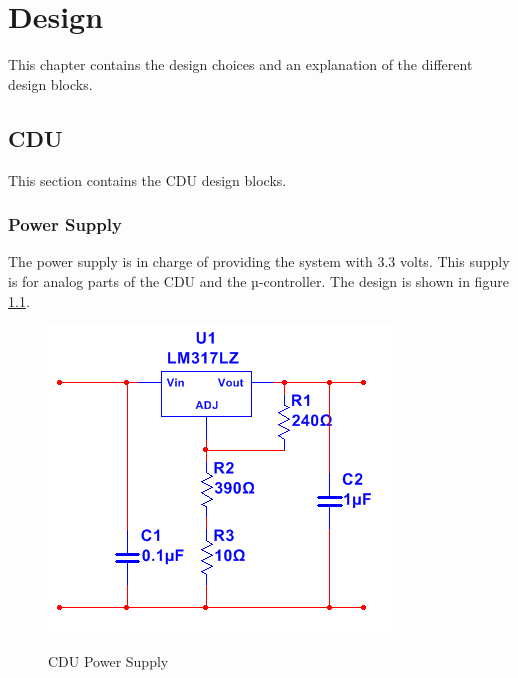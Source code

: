 \chapter{Design}
This chapter contains the design choices and an explanation of the different design blocks.

\section{CDU}
This section contains the CDU design blocks.
\subsection{Power Supply}
The power supply is in charge of providing the system with 3.3 volts. This supply is for analog parts of the CDU and the µ-controller. The design is shown in figure \ref{fig:cdupowersupply}.

\begin{figure}[H]
\centering
\includegraphics[scale=1]{billeder/cdupowersupply}
\label{fig:cdupowersupply}
\caption{CDU Power Supply}
\end{figure}

